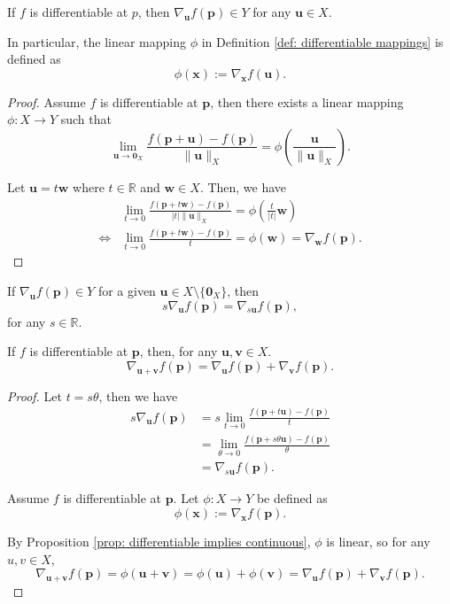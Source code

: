 \documentclass{article}
\begin{document}
\begin{proposition}
	\label{prop: differentiable implies continuous}
	If $f$ is differentiable at $p$, then $\nabla_{\mathbf u} f(\mathbf p) \in Y$ for any $\mathbf u \in X$.
	
	In particular, the linear mapping $\phi$ in Definition \ref{def: differentiable mappings} is defined as
	$$
	\phi(\mathbf x) := \nabla_{\mathbf x} f(\mathbf u).
	$$
	
	\begin{proof}
		Assume $f$ is differentiable at $\mathbf p$, then there exists a linear mapping $\phi: X \to Y$ such that
		$$
		\lim_{\mathbf u \to \mathbf 0_X} \frac{f(\mathbf p + \mathbf u) - f(\mathbf p)}{\|\mathbf u\|_{X}} = \phi\left( \frac{\mathbf u}{\| \mathbf u \|_X} \right).
		$$
		
		Let $\mathbf u = t \mathbf w$ where $t \in \mathbb R$ and $\mathbf w \in X$. Then, we have
		$$
		\begin{aligned}
			&\lim_{t \to 0} \frac{f(\mathbf p + t\mathbf w) - f(\mathbf p)}{|t|\| \mathbf u \|_X} = \phi\left( \frac{t}{|t|} \mathbf w \right) \\
			\iff & \lim_{t \to 0} \frac{f(\mathbf p + t\mathbf w) - f(\mathbf p)}{t} = \phi(\mathbf w) = \nabla_{\mathbf w} f(\mathbf p).
		\end{aligned}
		$$
	\end{proof}
\end{proposition}


\begin{proposition}
	If $\nabla_{\mathbf u} f(\mathbf p) \in Y$ for a given $\mathbf u \in X \setminus \{\mathbf 0_X\}$, then
	$$
	s \nabla_{\mathbf u} f(\mathbf p) = \nabla_{s\mathbf u} f(\mathbf p),
	$$
	for any $s \in \mathbb R$.
	
	If $f$ is differentiable at $\mathbf p$, then, for any $\mathbf u, \mathbf v \in X$.
	$$
	\nabla_{\mathbf u + \mathbf v} f(\mathbf p) = \nabla_{\mathbf u} f(\mathbf p) + \nabla_{\mathbf v} f(\mathbf p).
	$$
	
	\begin{proof}
		Let $t = s\theta$, then we have
		$$
		\begin{aligned}
			s\nabla_{\mathbf u} f(\mathbf p) &= s \lim_{t \to 0} \frac{f(\mathbf p + t\mathbf u) - f(\mathbf p)}{t} \\
			&= \lim_{\theta \to 0} \frac{f(\mathbf p + s\theta \mathbf u) - f(\mathbf p)}{\theta} \\
			&= \nabla_{s\mathbf u} f(\mathbf p).
		\end{aligned}
		$$
		
		Assume $f$ is differentiable at $\mathbf p$. Let $\phi:X \to Y$ be defined as
		$$
		\phi(\mathbf x) := \nabla_{\mathbf x} f(\mathbf p).
		$$
		
		By Proposition \ref{prop: differentiable implies continuous}, $\phi$ is linear, so for any $u, v \in X$,
		$$
		\nabla_{\mathbf u + \mathbf v}f(\mathbf p) = \phi(\mathbf u + \mathbf v) = \phi(\mathbf u) + \phi(\mathbf v) = \nabla_{\mathbf u} f(\mathbf p) + \nabla_{\mathbf v} f(\mathbf p).
		$$
	\end{proof}
\end{proposition}
\end{document}
